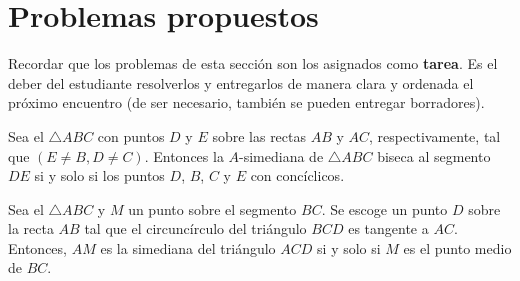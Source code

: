 \section{Problemas propuestos}

Recordar que los problemas de esta sección son los asignados como \textbf{tarea}.
Es el deber del estudiante resolverlos y entregarlos de manera clara y ordenada el próximo encuentro
(de ser necesario, también se pueden entregar borradores).

\begin{section-problem}
    Sea el $\triangle ABC$ con puntos $D$ y $E$ sobre las rectas $AB$ y $AC$, respectivamente, tal que $(E \neq B, D \neq C)$.
    Entonces la $A$-simediana de $\triangle ABC$ biseca al segmento $DE$ si y solo si los puntos $D$, $B$, $C$ y $E$ con concíclicos.
\end{section-problem}

\begin{section-problem}
    Sea el $\triangle ABC$ y $M$ un punto sobre el segmento $BC$.
    Se escoge un punto $D$ sobre la recta $AB$ tal que el circuncírculo del triángulo $BCD$ es tangente a $AC$.
    Entonces, $AM$ es la simediana del triángulo $ACD$ si y solo si $M$ es el punto medio de $BC$.
\end{section-problem}